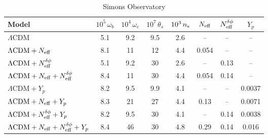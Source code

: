 \begin{subappendices}
\begin{table}
\begin{subtable}{\textwidth}
		\begin{tabular}{l c c c c c c c}
				\toprule
			Model											& {$10^{5}\,\omega_b$}	& {$10^{4}\,\omega_c$}	& {$10^{7}\,\theta_s$}	& {$10^{3}\,n_\mathrm{s}$}	& {$N_\mathrm{eff}$}	& {$N_\mathrm{eff}^{\delta\phi}$}	& {$Y_p$}	\\
				\midrule[0.065em]
			$\Lambda\mathrm{CDM}$							& 5.1						& 9.2						& 9.5						& 2.6				& {--} 		& {--}			& {--}		\\
			$\Lambda\mathrm{CDM} + N_\mathrm{eff}$					& 8.1						& 11						& 12						& 4.4				& 0.054		& {--}			& {--}		\\
			$\Lambda\mathrm{CDM} + N_\mathrm{eff}^{\delta\phi}$					& 5.1						& 9.2						& 30						& 2.6				& {--}		& 0.13			& {--}		\\
			$\Lambda\mathrm{CDM} + N_\mathrm{eff} + N_\mathrm{eff}^{\delta\phi}$			& 8.4						& 11						& 30						& 4.4				& 0.054		& 0.14			& {--}		\\
			$\Lambda\mathrm{CDM} + Y_p$						& 8.2						& 9.5						& 9.9						& 4.1				& {--}		& {--}			& 0.0037	\\
			$\Lambda\mathrm{CDM} + N_\mathrm{eff} + Y_p$				& 8.3						& 21						& 27						& 4.4				& 0.13		& {--}			& 0.0071	\\
			$\Lambda\mathrm{CDM} + N_\mathrm{eff}^{\delta\phi} + Y_p$			& 8.2						& 9.5						& 30						& 4.1				& {--}		& 0.14			& 0.0038	\\
			$\Lambda\mathrm{CDM} + N_\mathrm{eff} + N_\mathrm{eff}^{\delta\phi} + Y_p$	& 8.4						& 46						& 30						& 4.8				& 0.29		& 0.14			& 0.016		\\
				\bottomrule
		\end{tabular}
	
		\caption{Simons Observatory}
\end{subtable}\\[4pt]
	\begin{subtable}{\textwidth}
		\centering


\end{subtable}
\end{table}
\end{subappendices}
